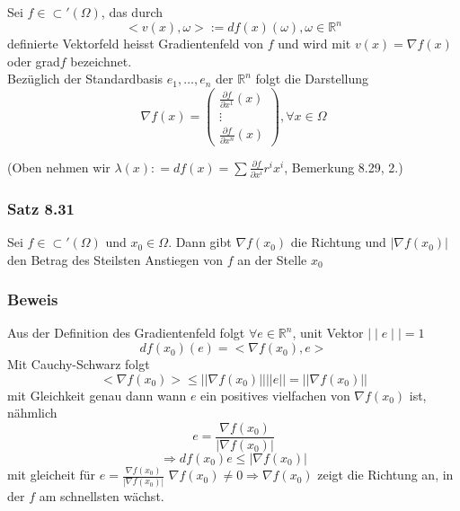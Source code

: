 \begin{definition}{8.30}
Sei $f\in\subset'\left(\Omega\right)$, das durch $$< v(x),\omega >:=df(x)(\omega ), \omega\in\mathbb{R}^n$$ definierte Vektorfeld heisst Gradientenfeld von $f$ und wird mit $v(x)=\nabla f(x)$ oder grad$f$ bezeichnet. \\

Bezüglich der Standardbasis $e_1,\dots, e_n$ der $\mathbb{R}^n$ folgt die Darstellung 
\[\nabla f(x) = \left( {\begin{array}{*{20}{c}}
{\frac{{\partial f}}{{\partial {x^1}}}(x)}\\
 \vdots \\
{\frac{{\partial f}}{{\partial {x^n}}}(x)}
\end{array}} \right),\forall x \in \Omega \]
\centerline{(Oben nehmen wir $\lambda (x): = df(x) = \sum {\frac{{\partial f}}{{\partial {x^i}}}{r^i}{x^i}} $, Bemerkung 8.29, 2.)}
\end{definition}
\subsubsection*{Satz 8.31}
Sei $f\in\subset '\left(\Omega\right)$ und $x_0\in\Omega$. Dann gibt $\nabla f\left(x_0\right)$ die Richtung und $\left| \nabla f\left(x_0\right)\right|$ den Betrag des Steilsten Anstiegen von $f$ an der Stelle $x_0$
\subsubsection*{Beweis}
Aus der Definition des Gradientenfeld folgt $\forall e\in\mathbb{R}^n$, unit Vektor $\mid\mid e\mid\mid =1$ $$df\left(x_0\right)\left( e\right)=< \nabla f\left( x_0\right) ,e >$$
Mit Cauchy-Schwarz folgt 
$$<\nabla f\left( x_0\right)>\leq\left|\left|\nabla f\left( x_0\right)\right|\right|\left|\left| e\right|\right| = \left|\left| \nabla f\left( x_0\right)\right|\right|$$
mit Gleichkeit genau dann wann $e$ ein positives vielfachen von $\nabla f\left( x_0\right)$ ist, nähmlich $$e=\frac{\nabla f\left( x_0\right)}{\left| \nabla f\left( x_0\right)\right|}$$ $$\Rightarrow df\left( x_0\right) e \leq \left| \nabla f\left( x_0\right)\right|$$
mit gleicheit für $e=\frac{\nabla f\left( x_0\right)}{\left| \nabla f\left( x_0\right)\right|}$
$\nabla f\left( x_0\right)\not= 0\Rightarrow \nabla f\left( x_0\right)$ zeigt die Richtung an, in der $f$ am schnellsten wächst.\\

